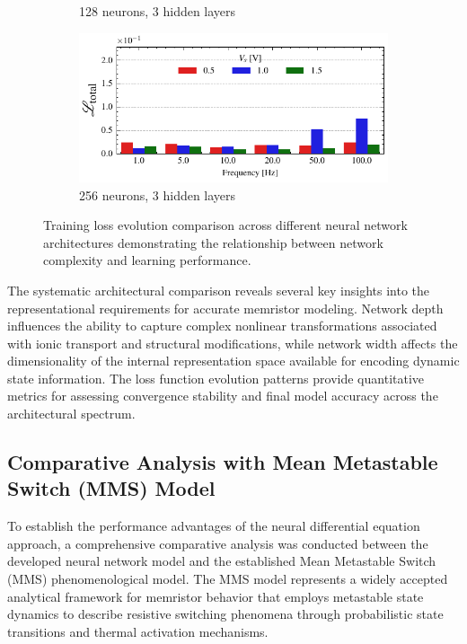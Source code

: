\documentclass[11pt, oneside]{article}
\begin{document}
\begin{figure}
\begin{subfigure}[c]{0.48\linewidth}
        \caption{128 neurons, 3 hidden layers}
    \end{subfigure}
    \begin{subfigure}[c]{0.48\linewidth}
        \centering
        \includegraphics[width=\linewidth]{sample_results/loss_per_freq_model_silu_256_3_cpu.pdf}
        \caption{256 neurons, 3 hidden layers}
    \end{subfigure}
    \caption{Training loss evolution comparison across different neural network architectures demonstrating the relationship between network complexity and learning performance. }
    \label{fig:loss_per_freq}
\end{figure}

The systematic architectural comparison reveals several key insights into the representational requirements for accurate memristor modeling. Network depth influences the ability to capture complex nonlinear transformations associated with ionic transport and structural modifications, while network width affects the dimensionality of the internal representation space available for encoding dynamic state information. The loss function evolution patterns provide quantitative metrics for assessing convergence stability and final model accuracy across the architectural spectrum.

\clearpage

\subsection{Comparative Analysis with Mean Metastable Switch (MMS) Model}

To establish the performance advantages of the neural differential equation approach, a comprehensive comparative analysis was conducted between the developed neural network model and the established Mean Metastable Switch (MMS) phenomenological model. The MMS model represents a widely accepted analytical framework for memristor behavior that employs metastable state dynamics to describe resistive switching phenomena through probabilistic state transitions and thermal activation mechanisms.
\end{document}
